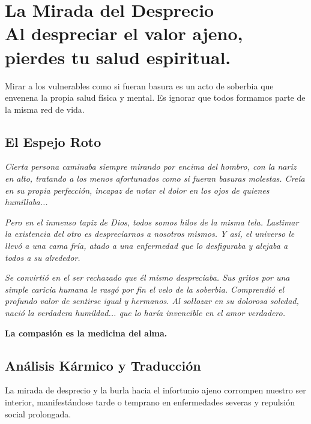 \chapter[La Mirada del Desprecio]{La Mirada del Desprecio\\ \large Al despreciar el valor ajeno, pierdes tu salud espiritual.}


\lettrine[lines=3, nindent=0.5em, findent=0.2em]{M}{}irar a los vulnerables como si fueran basura es un acto de soberbia que envenena la propia salud física y mental. Es ignorar que todos formamos parte de la misma red de vida.

\section{El Espejo Roto}
\begin{elegantquote}
\textit{Cierta persona caminaba siempre mirando por encima del hombro, con la nariz en alto, tratando a los menos afortunados como si fueran basuras molestas. Creía en su propia perfección, incapaz de notar el dolor en los ojos de quienes humillaba...}

\textit{Pero en el inmenso tapiz de Dios, todos somos hilos de la misma tela. Lastimar la existencia del otro es despreciarnos a nosotros mismos. Y así, el universo le llevó a una cama fría, atado a una enfermedad que lo desfiguraba y alejaba a todos a su alrededor.}

\textit{Se convirtió en el ser rechazado que él mismo despreciaba. Sus gritos por una simple caricia humana le rasgó por fin el velo de la soberbia. Comprendió el profundo valor de sentirse igual y hermanos. Al sollozar en su dolorosa soledad, nació la verdadera humildad... que lo haría invencible en el amor verdadero.}

\end{elegantquote}

\vspace{1em}
\begin{center}
    \textbf{\Large La compasión es la medicina del alma.}
\end{center}
\vspace{1em}

\section{Análisis Kármico y Traducción}
\begin{figure}
  \vspace{-1.5em}
  \begin{center}
  \end{center}
  \vspace{-1.5em}
\end{figure}
La mirada de desprecio y la burla hacia el infortunio ajeno corrompen nuestro ser interior, manifestándose tarde o temprano en enfermedades severas y repulsión social prolongada.


